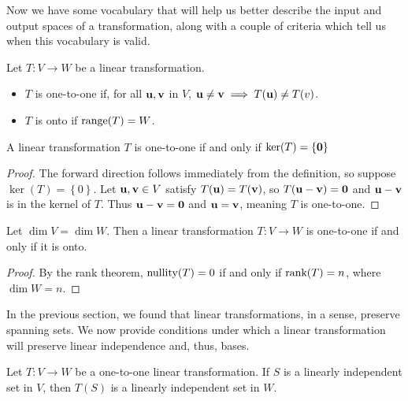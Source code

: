 \documentclass[../m073main.tex]{subfiles}
\begin{document}
Now we have some vocabulary that will help us better describe the input and output spaces of a transformation, along with a couple of criteria which tell us when this vocabulary is valid.

\begin{definition}
	Let $T : V \to W$ be a linear transformation.
	\begin{itemize}
		\item $T$ is one-to-one if, for all $\mathbf{u}, \mathbf{v}$ in $V$, $\mathbf{u} \neq \mathbf{v} \implies T(\mathbf{u}) \neq T(v)$.
		\item $T$ is onto if $\textrm{range}(T) = W$.
	\end{itemize}
\end{definition}

\begin{theorem}
	A linear transformation $T$ is one-to-one if and only if $\textrm{ker}(T) = \{\mathbf{0}\}$
\end{theorem}

\begin{proof}
	The forward direction follows immediately from the definition, so suppose $\ker(T) = \left\{ 0 \right\}$.
	Let $\mathbf{u}, \mathbf{v} \in V$ satisfy $T(\mathbf{u}) = T(\mathbf{v})$, so $T(\mathbf{u} - \mathbf{v}) = \mathbf{0}$ and $\mathbf{u} - \mathbf{v}$ is in the kernel of $T$.
	Thus $\mathbf{u} - \mathbf{v} = \mathbf{0}$ and $\mathbf{u} = \mathbf{v}$, meaning $T$ is one-to-one.
\end{proof}

\begin{theorem}
	Let $\dim V = \dim W$.
	Then a linear transformation $T : V \to W$ is one-to-one if and only if it is onto.
\end{theorem}

\begin{proof}
	By the rank theorem, $\textrm{nullity}(T) = 0$ if and only if $\textrm{rank}(T) = n$, where $\dim W = n$.
\end{proof}

In the previous section, we found that linear transformations, in a sense, preserve spanning sets.
We now provide conditions under which a linear transformation will preserve linear independence and, thus, bases.

\begin{theorem}
	Let $T : V \to W$ be a one-to-one linear transformation.
	If $S$ is a linearly independent set in $V$, then $T(S)$ is a linearly independent set in $W$.
\end{theorem}
\end{document}
